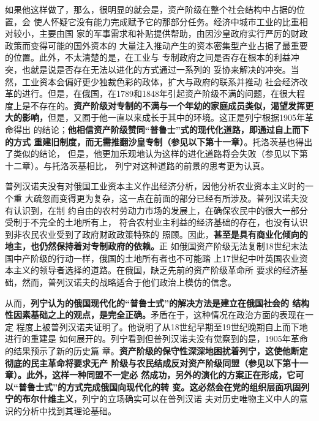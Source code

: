 如果他这样做了，那么，很明显的就会是，资产阶级在整个社会结构中占据的位置，会
使人怀疑它没有能力完成赋予它的那部分任务。经济中城市工业的比重相对较小，主要由国
家的军事需求和补贴提供帮助，由因沙皇政府实行严厉的财政政策而变得可能的国外资本的
大量注入推动产生的资本密集型产业占据了最重要的位置。此外，不太清楚的是，在工业与
专制政府之间是否存在根本的利益冲突，也就是说是否存在无法以进化的方式通过一系列的
妥协来解决的冲突。当然，工业资本会偏好更少独裁色彩的政体，扩大与政府的联系并推动
社会经济改革的进行。但是，在俄国，在1789和1848年引起资产阶级不满的问题，在很大程
度上是不存在的。\textbf{资产阶级对专制的不满与一个年幼的家庭成员类似，渴望发挥更
  大的影响，}但是，又囿于他一直以来成长于其中的环境。这正是列宁根据1905年革命得出
的结论；\textbf{他相信资产阶级赞同“普鲁士”式的现代化道路，即通过自上而下的方式
  重建旧制度，而无需推翻沙皇专制（参见以下第十一章）}。托洛茨基也得出了类似的结论，
但是，他更加乐观地认为这样的进化道路将会失败（参见以下第十二章）。与托洛茨基相比，
列宁对这种道路的前景的思考更为认真。

普列汉诺夫没有对俄国工业资本主义作出经济分析，因他分析农业资本主义时的一个重
大疏忽而变得更为复杂，这一点在前面的部分已经有所涉及。普列汉诺夫没有认识到，在制
约自由的农村劳动力市场的发展上，在确保农民中的很大一部分受制于不完全的土地所有上，
符合农村业主利益的经济基础的存在，也没有认识到非农民农业受到了政府财政政策特殊的
照顾。因此，\textbf{甚至是具有商业化倾向的地主，也仍然保持着对专制政府的依赖。}正
如俄国资产阶级无法复制18世纪末法国中产阶级的行动一样，俄国的土地所有者也不可能踏
上17世纪中叶英国农业资本主义的领导者选择的道路。在俄国，缺乏先前的资产阶级革命所
要求的经济基础，然而，普列汉诺夫的战略适合于他们政治上模仿的信念。

从而，\textbf{列宁认为的俄国现代化的“普鲁士式”的解决方法是建立在俄国社会的
  结构性因素基础之上的观点，是完全正确。}矛盾在于，这种情况在政治方面的表现在一定
程度上被普列汉诺夫证明了。他说明了从18世纪早期至19世纪晚期自上而下地进行的重建是
如何展开的。列宁看到但普列汉诺夫没有觉察到的是，1905年革命的结果预示了新的历史篇
章。\textbf{资产阶级的保守性深深地困扰着列宁，这使他断定彻底的民主革命将要求无产
  阶级与农民结成反对资产阶级同盟（参见以下第十一章）。此外，这样一种同盟不一定必
  然成功，另外的演化的方案正在形成，它可以“普鲁士式”的方式完成俄国向现代化的转
  变。这必然会在党的组织层面巩固列宁的布尔什维主义}，列宁的立场确实可以在普列汉诺
夫对历史唯物主义中人的意识的分析中找到其理论基础。

